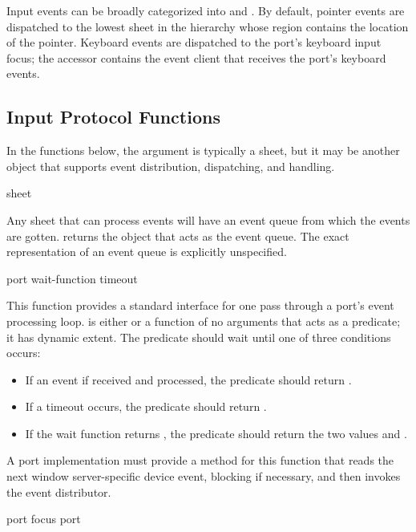 Input events can be broadly categorized into  and
.  By default, pointer events are dispatched to the
lowest sheet in the hierarchy whose region contains the location of the pointer.
Keyboard events are dispatched to the port's keyboard input focus; the accessor
 contains the event client that receives the
port's keyboard events.


\subsection {Input Protocol Functions}

In the functions below, the  argument is typically a sheet, but it
may be another object that supports event distribution, dispatching, and
handling.

 {sheet}

Any sheet that can process events will have an event queue from which the events
are gotten.   returns the object that acts as the event
queue.  The exact representation of an event queue is explicitly unspecified.

 {port \key wait-function timeout}

This function provides a standard interface for one pass through a port's event
processing loop.   is either  or a function of no
arguments that acts as a predicate; it has dynamic extent.  The predicate should
wait until one of three conditions occurs:

\begin{itemize}
\item If an event if received and processed, the predicate should return
.

\item If a timeout occurs, the predicate should return .

\item If the wait function returns , the predicate should return the
two values  and .
\end{itemize}

A port implementation must provide a method for this function that reads the
next window server-specific device event, blocking if necessary, and then
invokes the event distributor.

 {port}
 {focus port}

